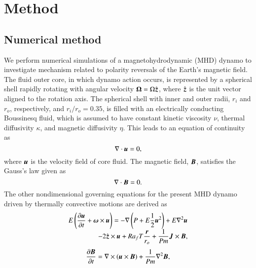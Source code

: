 \section{Method}
\label{section:method}

\subsection{Numerical method}

We perform numerical simulations of a magnetohydrodynamic (MHD) dynamo to investigate mechanism related to polarity reversals of the Earth's magnetic field.
The fluid outer core, in which dynamo action occurs, is represented by a spherical shell rapidly rotating with angular velocity $\mbox{\boldmath$\Omega$} = \Omega \hat{\mbox{\boldmath$z$}}$, where $\hat{\mbox{\boldmath$z$}}$ is the unit vector aligned to the rotation axis.
The spherical shell with inner and outer radii, $r_i$ and $r_o$, respectively, and $r_i / r_o = 0.35$, is filled with an electrically conducting Boussinesq fluid, which is assumed to have constant kinetic viscosity $\nu$, thermal diffusivity $\kappa$, and magnetic diffusivity $\eta$.
This leads to an equation of continuity as
%
\begin{equation}
\nabla \cdot \mbox{\boldmath$u$} = 0,
\label{eq:divu=0}
\end{equation}
%
where $\mbox{\boldmath$u$}$ is the velocity field of core fluid.
The magnetic field, $\mbox{\boldmath$B$}$, satisfies the Gauss's law given as
%
\begin{equation}
\nabla \cdot \mbox{\boldmath$B$} = 0.
\label{eq:divB=0}
\end{equation}
%
The other nondimensional governing equations for the present MHD dynamo driven by thermally convective motions are derived as
%
\begin{equation}
\begin{array}{l}
\displaystyle
E \left( \frac{\partial\bvec{u}}{\partial t} +
 \bvec{\omega} \times \bvec{u} \right) =
 - \nabla \left( P + E\frac{1}{2} \bvec{u}^2 \right)
 + E \nabla^2 \bvec{u}
\\
\displaystyle
\hspace*{\fill}
 -2 \hat{\bvec{z}} \times \bvec{u}
 + Ra_f T \frac{\bvec{r}}{r_o}
 + \frac{1}{Pm} \bvec{J} \times \bvec{B} ,
\end{array}
\label{eq:momentum}
\end{equation}
%
\begin{equation}
\frac{\partial \mbox{\boldmath$B$}}{\partial t} =
 \nabla \times (\mbox{\boldmath$u$} \times \mbox{\boldmath$B$} )
 + \frac{1}{Pm} \nabla^2 \mbox{\boldmath$B$} ,
\label{eq:induction}
\end{equation}
